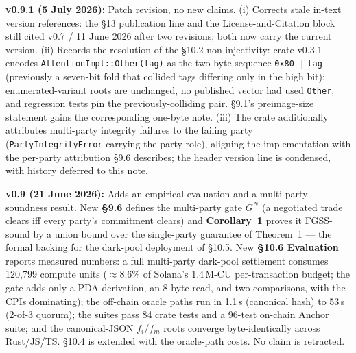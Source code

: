 \documentclass[11pt]{article}
\begin{document}
\textbf{v0.9.1 (5 July 2026):} Patch revision, no new claims. (i) Corrects stale in-text version references: the \S13 publication line and the License-and-Citation block still cited v0.7 / 11 June 2026 after two revisions; both now carry the current version. (ii) Records the resolution of the \S10.2 non-injectivity: crate v0.3.1 encodes \texttt{AttentionImpl::Other(tag)} as the two-byte sequence \texttt{0x80}\,$\|$\,\texttt{tag} (previously a seven-bit fold that collided tags differing only in the high bit); enumerated-variant roots are unchanged, no published vector had used \texttt{Other}, and regression tests pin the previously-colliding pair. \S9.1's preimage-size statement gains the corresponding one-byte note. (iii) The crate additionally attributes multi-party integrity failures to the failing party (\texttt{PartyIntegrityError} carrying the party role), aligning the implementation with the per-party attribution \S9.6 describes; the header version line is condensed, with history deferred to this note.

\textbf{v0.9 (21 June 2026):} Adds an empirical evaluation and a multi-party soundness result. New \textbf{\S9.6} defines the multi-party gate $G^N$ (a negotiated trade clears iff every party's commitment clears) and \textbf{Corollary~1} proves it FGSS-sound by a union bound over the single-party guarantee of Theorem~1 --- the formal backing for the dark-pool deployment of \S10.5. New \textbf{\S10.6 Evaluation} reports measured numbers: a full multi-party dark-pool settlement consumes 120{,}799 compute units ($\approx$8.6\% of Solana's 1.4\,M-CU per-transaction budget; the gate adds only a PDA derivation, an 8-byte read, and two comparisons, with the CPIs dominating); the off-chain oracle paths run in 1.1\,\textmu{}s (canonical hash) to 53\,\textmu{}s (2-of-3 quorum); the suites pass 84 crate tests and a 96-test on-chain Anchor suite; and the canonical-JSON $f_i$/$f_m$ roots converge byte-identically across Rust/JS/TS. \S10.4 is extended with the oracle-path costs. No claim is retracted.
\end{document}
